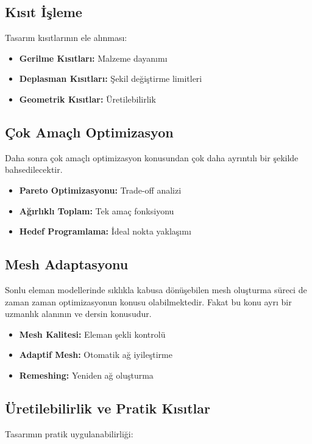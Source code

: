 \subsection{Kısıt İşleme}
Tasarım kısıtlarının ele alınması:

\begin{itemize}
    \item \textbf{Gerilme Kısıtları:} Malzeme dayanımı
    \item \textbf{Deplasman Kısıtları:} Şekil değiştirme limitleri
    \item \textbf{Geometrik Kısıtlar:} Üretilebilirlik
\end{itemize}

\subsection{Çok Amaçlı Optimizasyon}
Daha sonra çok amaçlı optimizasyon konusundan çok daha ayrıntılı bir şekilde bahsedilecektir.

\begin{tcolorbox}[title=Çok Amaçlı Yaklaşımlar]
\begin{itemize}
    \item \textbf{Pareto Optimizasyonu:} Trade-off analizi
    \item \textbf{Ağırlıklı Toplam:} Tek amaç fonksiyonu
    \item \textbf{Hedef Programlama:} İdeal nokta yaklaşımı
\end{itemize}
\end{tcolorbox}

\subsection{Mesh Adaptasyonu}
Sonlu eleman modellerinde sıklıkla kabusa dönüşebilen mesh oluşturma süreci de zaman zaman optimizasyonun konusu olabilmektedir. Fakat bu konu ayrı bir uzmanlık alanının ve dersin konusudur.

\begin{itemize}
    \item \textbf{Mesh Kalitesi:} Eleman şekli kontrolü
    \item \textbf{Adaptif Mesh:} Otomatik ağ iyileştirme
    \item \textbf{Remeshing:} Yeniden ağ oluşturma
\end{itemize}

\subsection{Üretilebilirlik ve Pratik Kısıtlar}
Tasarımın pratik uygulanabilirliği:

